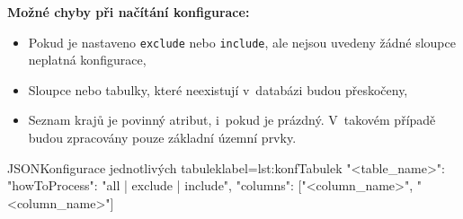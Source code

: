 \textbf{Možné chyby při načítání konfigurace:}
\begin{itemize}
    \item Pokud je nastaveno \texttt{exclude} nebo \texttt{include}, ale nejsou uvedeny žádné sloupce \textrightarrow{} neplatná konfigurace,
    \item Sloupce nebo tabulky, které neexistují v~databázi \textrightarrow{} budou přeskočeny,
    \item Seznam krajů je povinný atribut, i~pokud je prázdný. V~takovém případě budou zpracovány pouze základní územní prvky.
\end{itemize}

\begin{code}{JSON}{Konfigurace jednotlivých tabulek}{label=lst:konfTabulek}
    "<table_name>": {
        "howToProcess": "all | exclude | include",
        "columns": ["<column_name>", "<column_name>"]
    }
\end{code}
